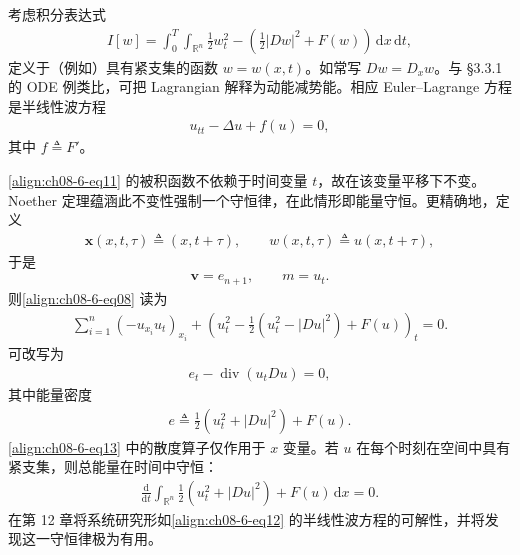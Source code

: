\documentclass[../../main.tex]{subfiles}
\begin{document}
\begin{example}[非线性波方程的能量守恒]\label{example:ch08-6-3-能量守恒}
考虑积分表达式
\begin{align}
I[w]=\int_0^T\int_{\mathbb{R}^n}\frac12w_t^2-\left(\frac12|Dw|^2+F(w)\right)\,\mathrm{d}x\,\mathrm{d}t,\label{align:ch08-6-eq11}
\end{align}
定义于（例如）具有紧支集的函数 $w=w(x,t)$。如常写 $Dw=D_xw$。与 \S3.3.1 的 ODE 例类比，可把 Lagrangian 解释为动能减势能。相应 Euler--Lagrange 方程是半线性波方程
\begin{align}
u_{tt}-\Delta u+f(u)=0,\label{align:ch08-6-eq12}
\end{align}
其中 $f\triangleq F'$。

\eqref{align:ch08-6-eq11} 的被积函数不依赖于时间变量 $t$，故在该变量平移下不变。Noether 定理蕴涵此不变性强制一个守恒律，在此情形即能量守恒。更精确地，定义
\begin{align*}
\mathbf{x}(x,t,\tau)\triangleq(x,t+\tau),\qquad w(x,t,\tau)\triangleq u(x,t+\tau),
\end{align*}
于是
\begin{align*}
\mathbf{v}=e_{n+1},\qquad m=u_t.
\end{align*}
则\eqref{align:ch08-6-eq08} 读为
\begin{align*}
\sum_{i=1}^n(-u_{x_i}u_t)_{x_i}+\left(u_t^2-\frac12(u_t^2-|Du|^2)+F(u)\right)_t=0.
\end{align*}
可改写为
\begin{align}
e_t-\operatorname{div}(u_tDu)=0,\label{align:ch08-6-eq13}
\end{align}
其中能量密度
\begin{align*}
e\triangleq\frac12(u_t^2+|Du|^2)+F(u).
\end{align*}
\eqref{align:ch08-6-eq13} 中的散度算子仅作用于 $x$ 变量。若 $u$ 在每个时刻在空间中具有紧支集，则总能量在时间中守恒：
\begin{align*}
\frac{\mathrm{d}}{\mathrm{d}t}\int_{\mathbb{R}^n}\frac12(u_t^2+|Du|^2)+F(u)\,\mathrm{d}x=0.
\end{align*}
在第 12 章将系统研究形如\eqref{align:ch08-6-eq12} 的半线性波方程的可解性，并将发现这一守恒律极为有用。
\end{example}
\end{document}
